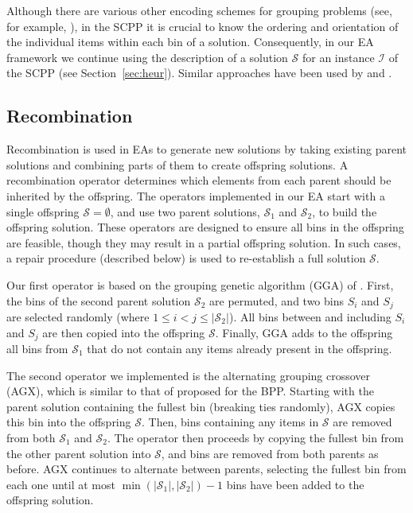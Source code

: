 \documentclass[a4paper,11pt,authoryear]{elsarticle}
\newcommand{\chng}[1]{{\color{myRed}#1}}
\begin{document}
Although there are various other encoding schemes for grouping problems (see, for example, \citet{falkenauer1993}), in the SCPP it is crucial to know the ordering and orientation of the individual items within each bin of a solution. Consequently, in our EA framework we continue using the \chng{description} of a solution $\mathcal{S}$ for an instance $\mathcal{I}$ of the SCPP \chng{(see Section~\ref{sec:heur})}. Similar approaches have been used by \citet{galinier1999} and \citet{lewis2017}.

\subsection{Recombination}
\label{sub:recomb}

\noindent Recombination is used in EAs to generate new solutions by taking existing parent solutions and combining parts of them to create offspring solutions. A recombination operator determines which elements from each parent should be inherited by the offspring. The operators implemented in our EA start with a single offspring $\mathcal{S} = \emptyset$, and use two parent solutions, $\mathcal{S}_1$ and $\mathcal{S}_2$, to build the offspring solution. These operators are designed to ensure all bins in the offspring are feasible, though they may result in a partial offspring solution. In such cases, a repair procedure (described below) is used to re-establish a full solution $\mathcal{S}$.

Our first operator is based on the grouping genetic algorithm (GGA) of \cite{falkenauer1992}. First, the bins of the second parent solution $\mathcal{S}_2$ are permuted, and two bins $S_i$ and $S_j$ are selected randomly (where $1 \leq i < j \leq |\mathcal{S}_2|$). All bins between and including $S_i$ and $S_j$ are then copied into the offspring $\mathcal{S}$. Finally, GGA adds to the offspring all bins from $\mathcal{S}_1$ that do not contain any items already present in the offspring.

The second operator we implemented is the alternating grouping crossover (AGX), which is similar to that of \cite{quiroz2015} proposed for the BPP. Starting with the parent solution containing the fullest bin (breaking ties randomly), AGX copies this bin into the offspring $\mathcal{S}$. Then, bins containing any items in $\mathcal{S}$ are removed from both $\mathcal{S}_1$ and $\mathcal{S}_2$. The operator then proceeds by copying the fullest bin from the other parent solution into $\mathcal{S}$, and bins are removed from both parents as before. AGX continues to alternate between parents, selecting the fullest bin from each one until at most $\min (|\mathcal{S}_1|,|\mathcal{S}_2|) - 1$ bins have been added to the offspring solution.
\end{document}
